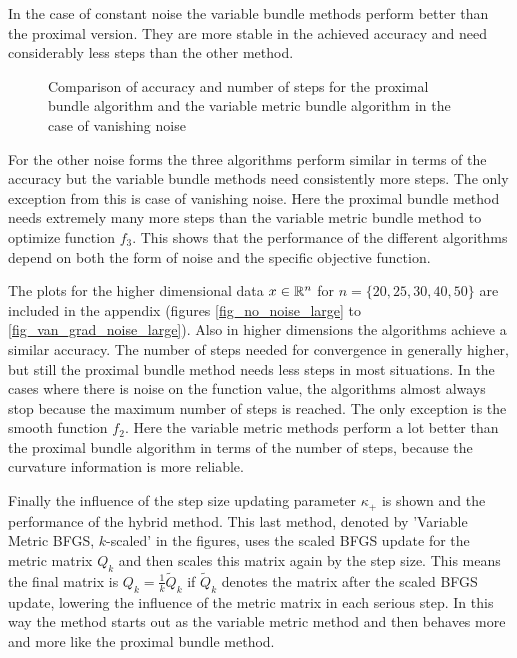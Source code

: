 In the case of constant noise the variable bundle methods perform better than the proximal version. They are more stable in the achieved accuracy and need considerably less steps than the other method.

\begin{figure}[ht]
	\begin{subfigure}{0.49\textwidth}
	\end{subfigure}
	\begin{subfigure}{0.49\textwidth}
	\end{subfigure}
	\caption[Accuracy and number of steps: vanishing noise]{Comparison of accuracy and number of steps for the proximal bundle algorithm and the variable metric bundle algorithm in the case of vanishing noise}%
	\label{fig_van_noise}%
\end{figure}

For the other noise forms the three algorithms perform similar in terms of the accuracy but the variable bundle methods need consistently more steps.
The only exception from this is case of vanishing noise. Here the proximal bundle method needs extremely many more steps  than the variable metric bundle method to optimize function \(f_3\). This shows that the performance of the different algorithms depend on both the form of noise and the specific objective function.

The plots for the higher dimensional data \(x \in \mathbb{R}^n\) for \(n = \{20,25,30,40,50\}\) are included in the appendix (figures \ref{fig_no_noise_large} to \ref{fig_van_grad_noise_large}).
Also in higher dimensions the algorithms achieve a similar accuracy. The number of steps needed for convergence in generally higher, but still the proximal bundle method needs less steps in most situations.
In the cases where there is noise on the function value, the algorithms almost always stop because the maximum number of steps is reached. The only exception is the smooth function \(f_2\). Here the variable  metric methods perform a lot better  than the proximal bundle algorithm in terms of the number  of steps, because the curvature information is more reliable.

Finally the influence of the step size updating parameter \(\kappa_+\) is shown and the performance of the hybrid method.
This last method, denoted by 'Variable Metric BFGS, \(k\)-scaled' in the figures, uses the scaled BFGS update for the metric matrix \(Q_k\) and then scales this matrix again by the step size. This means the final matrix is \(Q_k = \frac{1}{k}\tilde{Q}_k\) if \(\tilde{Q}_k\) denotes the matrix after the scaled BFGS update, lowering the influence of the metric matrix in each serious step.
In this way the method starts out as the variable metric method and then behaves more and more like the proximal bundle method.

